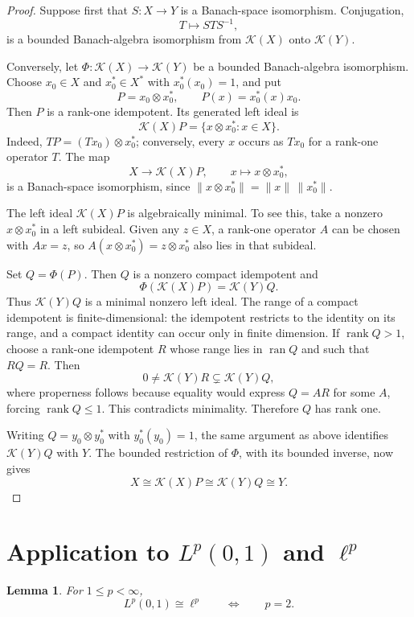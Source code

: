 \documentclass[11pt]{article}
\newtheorem{lemma}[theorem]{Lemma}
\newcommand{\Kop}{\mathcal K}
\begin{document}
\begin{proof}
Suppose first that $S:X\to Y$ is a Banach-space isomorphism.  Conjugation,
\[
  T\longmapsto STS^{-1},
\]
is a bounded Banach-algebra isomorphism from $\Kop(X)$ onto $\Kop(Y)$.

Conversely, let $\Phi:\Kop(X)\to\Kop(Y)$ be a bounded Banach-algebra
isomorphism.  Choose $x_0\in X$ and $x_0^*\in X^*$ with
$x_0^*(x_0)=1$, and put
\[
  P=x_0\otimes x_0^*,\qquad P(x)=x_0^*(x)x_0.
\]
Then $P$ is a rank-one idempotent.  Its generated left ideal is
\[
  \Kop(X)P=\{x\otimes x_0^*:x\in X\}.
\]
Indeed, $TP=(Tx_0)\otimes x_0^*$; conversely, every $x$ occurs as $Tx_0$
for a rank-one operator $T$.  The map
\[
  X\longrightarrow\Kop(X)P,\qquad x\longmapsto x\otimes x_0^*,
\]
is a Banach-space isomorphism, since
$\|x\otimes x_0^*\|=\|x\|\,\|x_0^*\|$.

The left ideal $\Kop(X)P$ is algebraically minimal.  To see this, take a
nonzero $x\otimes x_0^*$ in a left subideal.  Given any $z\in X$, a rank-one
operator $A$ can be chosen with $Ax=z$, so
$A(x\otimes x_0^*)=z\otimes x_0^*$ also lies in that subideal.

Set $Q=\Phi(P)$.  Then $Q$ is a nonzero compact idempotent and
\[
  \Phi(\Kop(X)P)=\Kop(Y)Q.
\]
Thus $\Kop(Y)Q$ is a minimal nonzero left ideal.  The range of a compact
idempotent is finite-dimensional: the idempotent restricts to the identity on
its range, and a compact identity can occur only in finite dimension.  If
$\operatorname{rank}Q>1$, choose a rank-one idempotent $R$ whose range lies
in $\operatorname{ran}Q$ and such that $RQ=R$.  Then
\[
  0\ne\Kop(Y)R\subsetneq\Kop(Y)Q,
\]
where properness follows because equality would express $Q=AR$ for some
$A$, forcing $\operatorname{rank}Q\le1$.  This contradicts minimality.
Therefore $Q$ has rank one.

Writing $Q=y_0\otimes y_0^*$ with $y_0^*(y_0)=1$, the same argument as above
identifies $\Kop(Y)Q$ with $Y$.  The bounded restriction of $\Phi$, with its
bounded inverse, now gives
\[
  X\cong\Kop(X)P\cong\Kop(Y)Q\cong Y.
\]
\end{proof}

\section{Application to \texorpdfstring{$L^p(0,1)$}{Lp(0,1)} and
\texorpdfstring{$\ell^p$}{ell-p}}

\begin{lemma}\label{lem:lp}
For $1\le p<\infty$,
\[
  L^p(0,1)\cong\ell^p \qquad\Longleftrightarrow\qquad p=2.
\]
\end{lemma}
\end{document}
